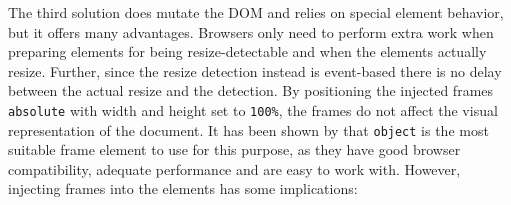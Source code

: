 \documentclass[a4paper,11pt]{kth-mag}
\newcommand{\code}[1]{\texttt{#1}}
\begin{document}
          The third solution does mutate the \gls{DOM} and relies on special \gls{element} behavior, but it offers many advantages.
          Browsers only need to perform extra work when preparing \glspl{element} for being resize-detectable and when the \glspl{element} actually resize.
          Further, since the resize detection instead is event-based there is no delay between the actual resize and the detection.
          By positioning the injected frames \code{absolute} with width and height set to \code{100\%}, the frames do not affect the visual representation of the document.
          It has been shown by \cite{backalley} that \code{object} is the most suitable frame \gls{element} to use for this purpose, as they have good \gls{browser} compatibility, adequate performance and are easy to work with.
          However, injecting frames into the \glspl{element} has some implications:
\end{document}
